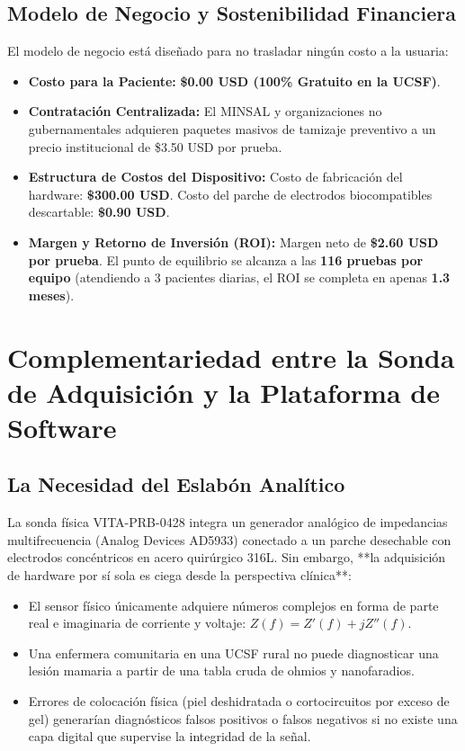 \documentclass[11pt,a4paper]{article}
\begin{document}
\subsection{Modelo de Negocio y Sostenibilidad Financiera}
El modelo de negocio está diseñado para no trasladar ningún costo a la usuaria:
\begin{itemize}
    \item \textbf{Costo para la Paciente:} \textbf{\$0.00 USD (100\% Gratuito en la UCSF)}.
    \item \textbf{Contratación Centralizada:} El MINSAL y organizaciones no gubernamentales adquieren paquetes masivos de tamizaje preventivo a un precio institucional de \$3.50 USD por prueba.
    \item \textbf{Estructura de Costos del Dispositivo:} Costo de fabricación del hardware: \textbf{\$300.00 USD}. Costo del parche de electrodos biocompatibles descartable: \textbf{\$0.90 USD}.
    \item \textbf{Margen y Retorno de Inversión (ROI):} Margen neto de \textbf{\$2.60 USD por prueba}. El punto de equilibrio se alcanza a las \textbf{116 pruebas por equipo} (atendiendo a 3 pacientes diarias, el ROI se completa en apenas \textbf{1.3 meses}).
\end{itemize}

\section{Complementariedad entre la Sonda de Adquisición y la Plataforma de Software}

\subsection{La Necesidad del Eslabón Analítico}
La sonda física VITA-PRB-0428 integra un generador analógico de impedancias multifrecuencia (Analog Devices AD5933) conectado a un parche desechable con electrodos concéntricos en acero quirúrgico 316L. Sin embargo, **la adquisición de hardware por sí sola es ciega desde la perspectiva clínica**:
\begin{itemize}
    \item El sensor físico únicamente adquiere números complejos en forma de parte real e imaginaria de corriente y voltaje: $Z(f) = Z'(f) + j Z''(f)$.
    \item Una enfermera comunitaria en una UCSF rural no puede diagnosticar una lesión mamaria a partir de una tabla cruda de ohmios y nanofaradios.
    \item Errores de colocación física (piel deshidratada o cortocircuitos por exceso de gel) generarían diagnósticos falsos positivos o falsos negativos si no existe una capa digital que supervise la integridad de la señal.
\end{itemize}
\end{document}
